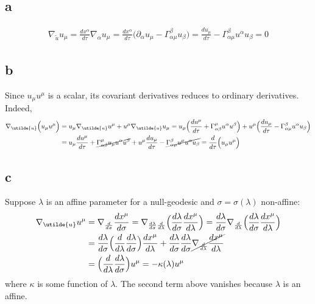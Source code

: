 \documentclass{article}
\begin{document}
\subsection*{a}
\begin{align*}
 \nabla_{\utilde{u}}u_\mu = \frac{dx^\alpha}{d\tau} \nabla_{\alpha}u_\mu
= \frac{dx^\alpha}{d\tau} \Big(\partial_\alpha u_\mu - \Gamma^{\beta}_{\alpha\mu}u_\beta \Big)
= \frac{du_\mu}{d\tau} - \Gamma^\beta_{\alpha\mu}u^\alpha u_\beta = 0
\end{align*}
\subsection*{b}
Since $u_\mu u^\mu$ is a scalar, its covariant derivatives reduces to ordinary derivatives. Indeed,
\begin{align*}
 \nabla_{\utilde{u}} \Big(u_\mu u^\mu\Big) 
&= u_\mu \nabla_{\utilde{u}} u^\mu + u^\mu \nabla_{\utilde{u}} u_\mu 
=  u_\mu \Big(\frac{du^\mu}{d\tau} + \Gamma^\mu_{\alpha\beta}u^\alpha u^\beta \Big)
	+ u^\mu \Big(  \frac{du_\mu}{d\tau} - \Gamma^\beta_{\alpha\mu}u^\alpha u_\beta \Big)\\
&=  u_\mu\frac{du^\mu}{d\tau} + \cancel{\Gamma^\mu_{\alpha\beta}u_\mu u^\alpha u^\beta}
	+  u^\mu  \frac{du_\mu}{d\tau} - \cancel{\Gamma^\beta_{\alpha\mu}u^\mu  u^\alpha u_\beta}
= \frac{d}{d\tau}\Big(u_\mu u^\mu \Big)
\end{align*}
\subsection*{c}
Suppose $\lambda$ is an affine parameter for a null-geodesic and $\sigma = \sigma(\lambda)$ non-affine:
\begin{align*}
 \nabla_{\utilde{u}}u^\mu &= \nabla_{\frac{d}{d\sigma}}\frac{dx^\mu}{d\sigma} 
	= \nabla_{\frac{d\lambda}{d\sigma}\frac{d}{d\lambda}}\Big(\frac{d\lambda}{d\sigma}\frac{dx^\mu}{d\lambda}\Big)
	= \frac{d\lambda}{d\sigma} \nabla_{\frac{d}{d\lambda}}\Big(\frac{d\lambda}{d\sigma}\frac{dx^\mu}{d\lambda}\Big) \\
	&= \frac{d\lambda}{d\sigma} \Big(\frac{d}{d\lambda}\frac{d\lambda}{d\sigma} \Big)\frac{dx^\mu}{d\lambda}
	+ \frac{d\lambda}{d\sigma}\frac{d\lambda}{d\sigma} \cancel{\nabla_{\frac{d}{d\lambda}}\frac{dx^\mu}{d\lambda}} \\
	&= \Big(\frac{d}{d\lambda}\frac{d\lambda}{d\sigma}\Big) u^\mu = - \kappa(\lambda) u^\mu
\end{align*}
where $\kappa$ is some function of $\lambda$. The second term above vanishes because $\lambda$ is an affine.
\end{document}
